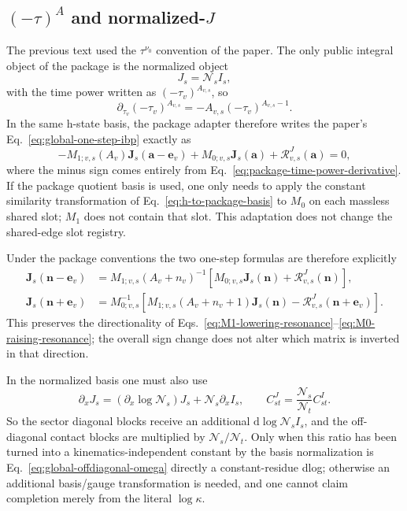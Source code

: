 \documentclass[11pt,a4paper]{article}
\newcommand{\dd}{\mathrm d}
\newcommand{\cR}{\mathcal R}
\newcommand{\cN}{\mathcal N}
\begin{document}
\subsection{\texorpdfstring{$(-\tau)^A$ and normalized-$J$}{(-tau)A and normalized-J}}

The previous text used the $\tau^{\nu_0}$ convention of the paper. The only public integral object of the package is the normalized object
\begin{equation}
 J_s=\cN_sI_s,
\end{equation}
with the time power written as $(-\tau_v)^{A_{v,s}}$, so
\begin{equation}
 \partial_{\tau_v}(-\tau_v)^{A_{v,s}}
 =-A_{v,s}(-\tau_v)^{A_{v,s}-1}.
 \label{eq:package-time-power-derivative}
\end{equation}
In the same h-state basis, the package adapter therefore writes the paper's Eq.~\eqref{eq:global-one-step-ibp} exactly as
\begin{equation}
 -M_{1;v,s}(A_v)\bm J_s(\bm a-\bm e_v)
 +M_{0;v,s}\bm J_s(\bm a)
 +\cR^{J}_{v,s}(\bm a)=0,
 \label{eq:package-one-step-ibp}
\end{equation}
where the minus sign comes entirely from Eq.~\eqref{eq:package-time-power-derivative}. If the package quotient basis is used, one only needs to apply the constant similarity transformation of Eq.~\eqref{eq:h-to-package-basis} to $M_0$ on each massless shared slot; $M_1$ does not contain that slot. This adaptation does not change the shared-edge slot registry.

Under the package conventions the two one-step formulas are therefore explicitly
\begin{align}
 \bm J_s(\bm n-\bm e_v)
 &=M_{1;v,s}(A_v+n_v)^{-1}
 \left[M_{0;v,s}\bm J_s(\bm n)+\cR^J_{v,s}(\bm n)\right],
 \label{eq:package-lowering}\\
 \bm J_s(\bm n+\bm e_v)
 &=M_{0;v,s}^{-1}
 \left[M_{1;v,s}(A_v+n_v+1)\bm J_s(\bm n)
 -\cR^J_{v,s}(\bm n+\bm e_v)\right].
 \label{eq:package-raising}
\end{align}
This preserves the directionality of Eqs.~\eqref{eq:M1-lowering-resonance}--\eqref{eq:M0-raising-resonance}; the overall sign change does not alter which matrix is inverted in that direction.

In the normalized basis one must also use
\begin{equation}
 \partial_xJ_s
 =(\partial_x\log\cN_s)J_s+\cN_s\partial_xI_s,
 \qquad
 C^{J}_{st}=\frac{\cN_s}{\cN_t}C^{I}_{st}.
 \label{eq:normalization-adapter}
\end{equation}
So the sector diagonal blocks receive an additional $\dd\log\cN_sI_s$, and the off-diagonal contact blocks are multiplied by $\cN_s/\cN_t$. Only when this ratio has been turned into a kinematics-independent constant by the basis normalization is Eq.~\eqref{eq:global-offdiagonal-omega} directly a constant-residue dlog; otherwise an additional basis/gauge transformation is needed, and one cannot claim completion merely from the literal $\log\kappa$.
\end{document}
